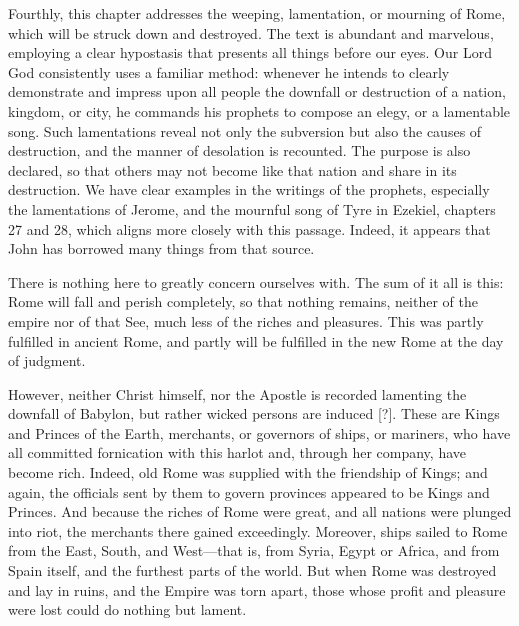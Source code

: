 Fourthly, this chapter addresses the weeping, lamentation, or mourning of Rome, which will be struck down and destroyed. The text is abundant and marvelous, employing a clear hypostasis that presents all things before our eyes. Our Lord God consistently uses a familiar method: whenever he intends to clearly demonstrate and impress upon all people the downfall or destruction of a nation, kingdom, or city, he commands his prophets to compose an elegy, or a lamentable song. Such lamentations reveal not only the subversion but also the causes of destruction, and the manner of desolation is recounted. The purpose is also declared, so that others may not become like that nation and share in its destruction. We have clear examples in the writings of the prophets, especially the lamentations of Jerome, and the mournful song of Tyre in Ezekiel, chapters 27 and 28, which aligns more closely with this passage. Indeed, it appears that John has borrowed many things from that source.

There is nothing here to greatly concern ourselves with. The sum of it all is this: Rome will fall and perish completely, so that nothing remains, neither of the empire nor of that See, much less of the riches and pleasures. This was partly fulfilled in ancient Rome, and partly will be fulfilled in the new Rome at the day of judgment.

However, neither Christ himself, nor the Apostle is recorded lamenting the downfall of Babylon, but rather wicked persons are induced [?]. These are Kings and Princes of the Earth, merchants, or governors of ships, or mariners, who have all committed fornication with this harlot and, through her company, have become rich. Indeed, old Rome was supplied with the friendship of Kings; and again, the officials sent by them to govern provinces appeared to be Kings and Princes. And because the riches of Rome were great, and all nations were plunged into riot, the merchants there gained exceedingly. Moreover, ships sailed to Rome from the East, South, and West—that is, from Syria, Egypt or Africa, and from Spain itself, and the furthest parts of the world. But when Rome was destroyed and lay in ruins, and the Empire was torn apart, those whose profit and pleasure were lost could do nothing but lament.

